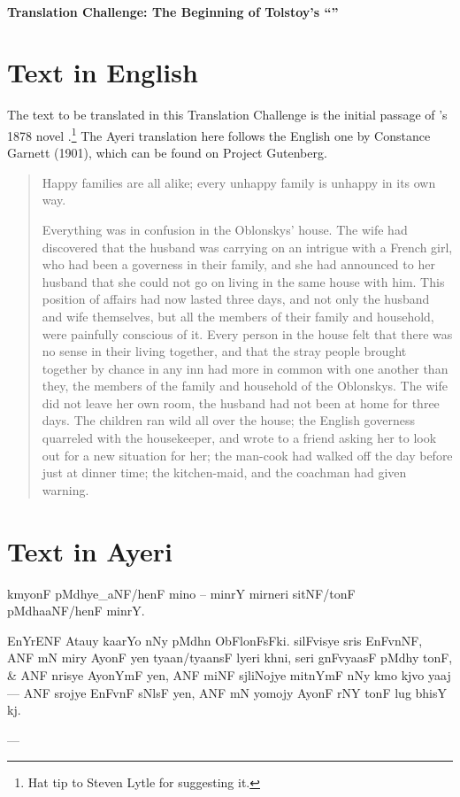 \documentclass[12pt,paper=letter]{scrartcl}
\newcommand{\q}[1]{\enquote{#1}} %
\newenvironment{ayeri}{
    \doublespacing
    \begin{multicols}{2}
    \Tagati
}{
    \end{multicols} \par
}
\newenvironment{mytitle}{
    \begin{center}
	\Large
	\sffamily\bfseries
	~\\
}{
    \end{center}
}
\begin{document}

\begin{mytitle}
    Translation Challenge: The Beginning of Tolstoy's \q{}
\end{mytitle}

\section{Text in English}

The text to be translated in this Translation Challenge is the initial passage
of \citeauthor{tolstoy}'s 1878 novel .\footnote{Hat tip to 
Steven Lytle for suggesting it.} The Ayeri translation here follows the English 
one by Constance Garnett (1901), which can be found on Project Gutenberg.

\blockcquote{tolstoy}{
\noindent Happy families are all alike; every unhappy family is unhappy in its 
own way.

Everything was in confusion in the Oblonskys’ house. The wife had discovered 
that the husband was carrying on an intrigue with a French girl, who had been a 
governess in their family, and she had announced to her husband that she could 
not go on living in the same house with him. This position of affairs had now 
lasted three days, and not only the husband and wife themselves, but all the 
members of their family and household, were painfully conscious of it. Every 
person in the house felt that there was no sense in their living together, and 
that the stray people brought together by chance in any inn had more in common 
with one another than they, the members of the family and household of the 
Oblonskys. The wife did not leave her own room, the husband had not been at 
home for three days. The children ran wild all over the house; the English 
governess quarreled with the housekeeper, and wrote to a friend asking her to 
look out for a new situation for her; the man-cook had walked off the day 
before just at dinner time; the kitchen-maid, and the coachman had given warning.
}

\section{Text in Ayeri}
\begin{ayeri}
kmyonF pMdhye\_aNF/henF mino – minrY mirneri sitNF/tonF pMdhaaNF/henF minrY.

EnYrENF Atauy kaarYo nNy pMdhn ObFlonFsFki. silF\-visye sris EnFvnNF, ANF mN miry
AyonF yen tyaan/tyaansF lyeri khni, seri gnFvyaasF pMdhy tonF, \& ANF nrisye
AyonYmF yen, ANF miNF sjliNojye mitnYmF nNy kmo kjvo yaaj --- ANF srojye 
EnFvnF sNlsF yen, ANF mN yomojy AyonF rNY tonF lug bhisY kj.

--- 
\end{ayeri}
\end{document}
